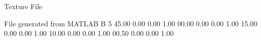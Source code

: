 Texture File

File generated from MATLAB
B 5
   45.00   0.00   0.00   1.00
   00.00   0.00   0.00   1.00
   15.00   0.00   0.00   1.00
   10.00   0.00   0.00   1.00
   00.50   0.00   0.00   1.00